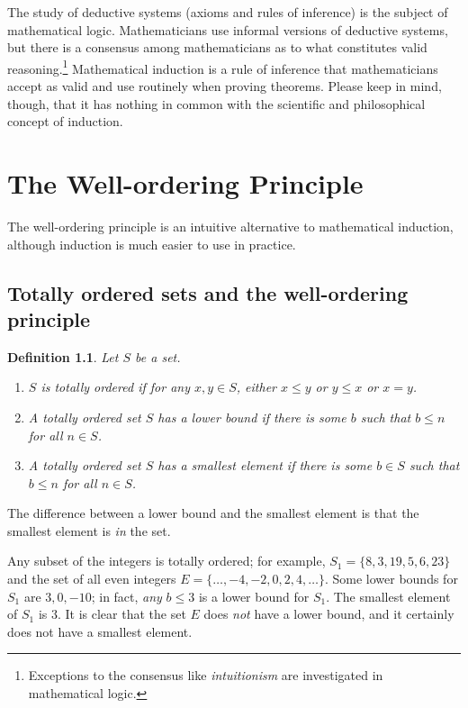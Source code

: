 \documentclass[11pt,a4paper]{report}
\newtheorem{definition}[theorem]{Definition}
\begin{document}
The study of deductive systems (axioms and rules of inference) is the subject of mathematical logic. Mathematicians use informal versions of deductive systems, but there is a consensus among mathematicians as to what constitutes valid reasoning.\footnote{Exceptions to the consensus like \emph{intuitionism} are investigated in mathematical logic.} Mathematical induction is a rule of inference that mathematicians accept as valid and use routinely when proving theorems. Please keep in mind, though, that it has nothing in common with the scientific and philosophical concept of induction.



\chapter{The Well-ordering Principle}\label{s.well}

The well-ordering principle is an intuitive alternative to mathematical induction, although induction is much easier to use in practice.

\section{Totally ordered sets and the well-ordering principle}

\begin{definition} Let $S$ be a set.
\begin{enumerate}
\item $S$ is \emph{totally ordered} if for any $x,y\in S$, either $x\leq y$ or $y \leq x$ or $x=y$.
\item A totally ordered set $S$ has a \emph{lower bound} if there is some $b$ such that $b\leq n$ for all $n\in S$.
\item A totally ordered set $S$ has a \emph{smallest element} if there is some $b\in S$ such that $b\leq n$ for all $n\in S$.
\end{enumerate}
\end{definition}

The difference between a lower bound and the smallest element is that the smallest element is \emph{in} the set.

Any subset of the integers is totally ordered; for example, $S_1=\{8,3,19,5,6,23\}$ and the set of all even integers $E=\{\ldots, -4, -2, 0, 2, 4, \ldots\}$. Some lower bounds for $S_1$ are $3, 0, -10$; in fact, \emph{any} $b\leq 3$ is a lower bound for $S_1$. The smallest element of $S_1$ is $3$. It is clear that the set $E$ does \emph{not} have a lower bound, and it certainly does not have a smallest element.
\end{document}
